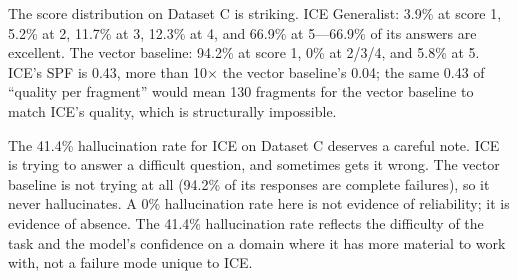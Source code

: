 \documentclass[11pt,a4paper]{article}
\begin{document}
\begin{table}[htbp]
\centering
\small
\caption{ICE-Dev stress test (154 probes). The vector baseline collapses to a 94.2\% failure rate on the technical-planning conversation because it has no token-budget cap. ICE survives the same conversation with a mean score of 4.33 and 77\% fewer tokens injected. Note: the vector baseline's 0\% hallucination rate is misleading---94.2\% of its responses are complete failures (score 1), so there is no answer to evaluate for hallucination.}
\label{tab:stress}
\end{table}

The score distribution on Dataset C is striking. ICE Generalist: 3.9\% at score 1, 5.2\% at 2, 11.7\% at 3, 12.3\% at 4, and 66.9\% at 5---66.9\% of its answers are excellent. The vector baseline: 94.2\% at score 1, 0\% at 2/3/4, and 5.8\% at 5. ICE's SPF is 0.43, more than 10$\times$ the vector baseline's 0.04; the same 0.43 of ``quality per fragment'' would mean 130 fragments for the vector baseline to match ICE's quality, which is structurally impossible.

The 41.4\% hallucination rate for ICE on Dataset C deserves a careful note. ICE is trying to answer a difficult question, and sometimes gets it wrong. The vector baseline is not trying at all (94.2\% of its responses are complete failures), so it never hallucinates. A 0\% hallucination rate here is not evidence of reliability; it is evidence of absence. The 41.4\% hallucination rate reflects the difficulty of the task and the model's confidence on a domain where it has more material to work with, not a failure mode unique to ICE.
\end{document}

